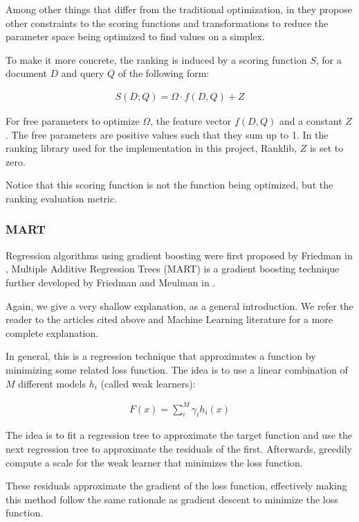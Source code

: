 Among other things that differ from the traditional optimization, in \cite{Metzler2006LinearFM} they propose 
other constraints to the scoring functions and transformations to reduce the parameter space 
being optimized to find values on a simplex.

To make it more concrete, the ranking is induced by a scoring function $S$, for a document $D$ and query $Q$
 of the following form:

\begin{align*}
S(D; Q) = \Omega \cdot f(D, Q) + Z
\end{align*}

For free parameters to optimize $\Omega$, the feature vector $f(D, Q)$ and a constant $Z$. The free parameters are positive 
values such that they sum up to 1. In the ranking library used for the implementation in this project, Ranklib, $Z$ is set to zero.

Notice that this scoring function is not the function being optimized, but the ranking evaluation metric.

\subsubsection{MART}
Regression algorithms using gradient boosting were first proposed by Friedman in \cite{Friedman2001GreedyFA},
Multiple Additive Regression Trees (MART) is a gradient boosting technique further developed by Friedman and
Meulman in \cite{Friedman2003MultipleAR}.

Again, we give a very shallow explanation, as a general introduction. We refer the reader to the articles
cited above and Machine Learning literature for a more complete explanation.

In general, this is a regression technique that approximates a function by minimizing some related loss 
function. The idea is to use a linear combination of $M$ different models $h_i$ (called weak learners):

\begin{align*}
F(x) = \sum_{i}^M \gamma_i h_i(x)
\end{align*}

The idea is to fit a regression tree to approximate the target function and use the next regression tree to
approximate the residuals of the first. Afterwards, greedily compute a scale for the weak learner that minimizes
the loss function.

These residuals approximate the gradient of the loss function, effectively making this method follow the same
rationale as gradient descent to minimize the loss function.

